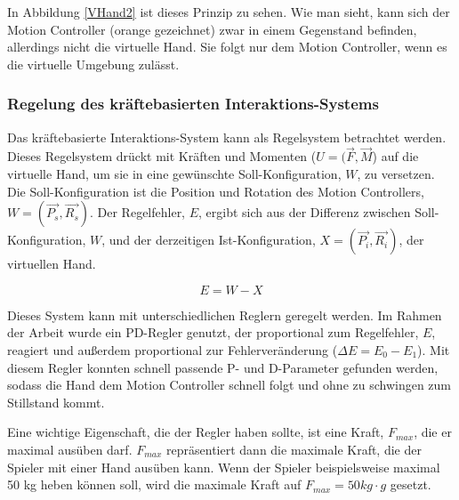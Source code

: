 In Abbildung \ref{VHand2} ist dieses Prinzip zu sehen. Wie man sieht, kann sich der Motion Controller (orange gezeichnet) zwar in einem Gegenstand befinden, allerdings nicht die virtuelle Hand. Sie folgt nur dem Motion Controller, wenn es die virtuelle Umgebung zulässt.


\subsubsection{Regelung des kräftebasierten Interaktions-Systems}
Das kräftebasierte Interaktions-System kann als Regelsystem betrachtet werden. Dieses Regelsystem drückt mit Kräften und Momenten ($U = (\vec{F} , \vec{M}$) auf die virtuelle Hand, um sie in eine gewünschte Soll-Konfiguration, $W$, zu versetzen. Die Soll-Konfiguration ist die Position und Rotation des Motion Controllers, $W = (\vec{P_s} , \vec{R_s})$. Der Regelfehler, $E$, ergibt sich aus der Differenz zwischen Soll-Konfiguration, $W$, und der derzeitigen Ist-Konfiguration, $X = (\vec{P_i} , \vec{R_i})$, der virtuellen Hand.

\begin{equation}
E = W - X
\label{form_error}
\end{equation}

Dieses System kann mit unterschiedlichen Reglern geregelt werden. Im Rahmen der Arbeit wurde ein PD-Regler genutzt, der proportional zum Regelfehler, $E$, reagiert und außerdem proportional zur Fehlerveränderung ($\Delta E = E_0 - E_1$). Mit diesem Regler konnten schnell passende P- und D-Parameter gefunden werden, sodass die Hand dem Motion Controller schnell folgt und ohne zu schwingen zum Stillstand kommt.

Eine wichtige Eigenschaft, die der Regler haben sollte, ist eine Kraft, $F_{max}$, die er maximal ausüben darf. $F_{max}$ repräsentiert dann die maximale Kraft, die der Spieler mit einer Hand ausüben kann. Wenn der Spieler beispielsweise maximal 50 kg heben können soll, wird die maximale Kraft auf $F_{max} = 50kg \cdot g$ gesetzt.


